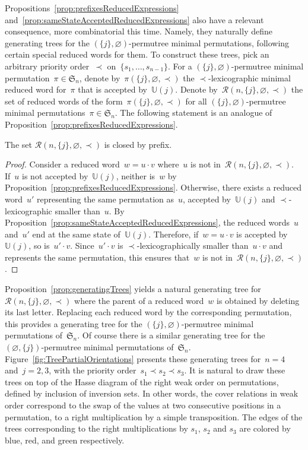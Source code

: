 \documentclass[ALCO]{cedram}
\newcommand{\fS}{\mathfrak{S}}
\newcommand{\automatonU}{\mathbb{U}}
\newcommand{\lexmin}{\mathcal{R}}
\begin{document}
Propositions~\ref{prop:prefixesReducedExpressions} and~\ref{prop:sameStateAcceptedReducedExpressions} also have a relevant consequence, more combinatorial this time.
Namely, they naturally define generating trees for the $(\{j\}, \varnothing)$-permutree minimal permutations, following certain special reduced words for them.
To construct these trees, pick an arbitrary priority order~$\prec$ on~$\{s_1, \dots, s_{n-1}\}$.
For a $(\{j\}, \varnothing)$-permutree minimal permutation~$\pi \in \fS_n$, denote by~$\pi(\{j\}, \varnothing, \prec)$ the $\prec$-lexicographic minimal reduced word for~$\pi$ that is accepted by~$\automatonU(j)$.
Denote by~$\lexmin(n, \{j\}, \varnothing, \prec)$ the set of reduced words of the form~$\pi(\{j\}, \varnothing, \prec)$ for all $(\{j\}, \varnothing)$-permutree minimal permutations~$\pi \in \fS_n$.
The following statement is an analogue of Proposition~\ref{prop:prefixesReducedExpressions}.

\begin{proposition}\label{prop:generatingTrees}
The set $\lexmin(n, \{j\}, \varnothing, \prec)$ is closed by prefix.
\end{proposition}

\begin{proof}
Consider a reduced word~$w = u \cdot v$ where~$u$ is not in~$\lexmin(n, \{j\}, \varnothing, \prec)$.
If~$u$ is not accepted by~$\automatonU(j)$, neither is~$w$ by Proposition~\ref{prop:prefixesReducedExpressions}.
Otherwise, there exists a reduced word~$u'$ representing the same permutation as~$u$, accepted by~$\automatonU(j)$ and \mbox{$\prec$-lexicographic} smaller than~$u$.
By Proposition~\ref{prop:sameStateAcceptedReducedExpressions}, the reduced words~$u$ and~$u'$ end at the same state of~$\automatonU(j)$.
Therefore, if~$w = u \cdot v$ is accepted by~$\automatonU(j)$, so is~$u' \cdot v$.
Since~$u' \cdot v$ is \mbox{$\prec$-lexicographically} smaller than~$u \cdot v$ and represents the same permutation, this ensures that~$w$ is not in~$\lexmin(n, \{j\}, \varnothing, \prec)$.
\end{proof}

Proposition~\ref{prop:generatingTrees} yields a natural generating tree for $\lexmin(n, \{j\}, \varnothing, \prec)$ where the parent of a reduced word~$w$ is obtained by deleting its last letter.
Replacing each reduced word by the corresponding permutation, this provides a generating tree for the $(\{j\}, \varnothing)$-permutree minimal permutations of~$\fS_n$.
Of course there is a similar generating tree for the $(\varnothing, \{j\})$-permutree minimal permutations of~$\fS_n$.
Figure~\ref{fig:TreePartialOrientations} presents these generating trees for~$n = 4$ and~$j = 2, 3$, with the priority order~${s_1 \prec s_2 \prec s_3}$.
It is natural to draw these trees on top of the Hasse diagram of the right weak order on permutations, defined by inclusion of inversion sets.
In other words, the cover relations in weak order correspond to the swap of the values at two consecutive positions in a permutation, \ie to a right multiplication by a simple transposition.
The edges of the trees corresponding to the right multiplications by $s_1$, $s_2$ and $s_3$ are colored by blue, red, and green respectively.
\end{document}
